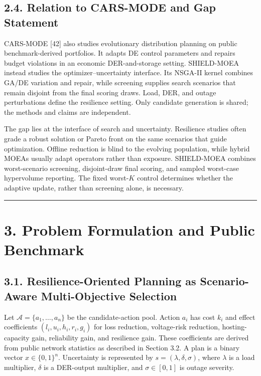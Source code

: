 \documentclass[
  10pt,
  a4paper,
]{article}
\begin{document}
\subsection{2.4. Relation to CARS-MODE and Gap
Statement}\label{relation-to-cars-mode-and-gap-statement}

CARS-MODE {[}42{]} also studies evolutionary distribution planning on
public benchmark-derived portfolios. It adapts DE control parameters and
repairs budget violations in an economic DER-and-storage setting.
SHIELD-MOEA instead studies the optimizer--uncertainty interface. Its
NSGA-II kernel combines GA/DE variation and repair, while screening
supplies search scenarios that remain disjoint from the final scoring
draws. Load, DER, and outage perturbations define the resilience
setting. Only candidate generation is shared; the methods and claims are
independent.

The gap lies at the interface of search and uncertainty. Resilience
studies often grade a robust solution or Pareto front on the same
scenarios that guide optimization. Offline reduction is blind to the
evolving population, while hybrid MOEAs usually adapt operators rather
than exposure. SHIELD-MOEA combines worst-scenario screening,
disjoint-draw final scoring, and sampled worst-case hypervolume
reporting. The fixed worst-\(K\) control determines whether the adaptive
update, rather than screening alone, is necessary.

\begin{center}\rule{0.5\linewidth}{0.5pt}\end{center}

\section{3. Problem Formulation and Public
Benchmark}\label{problem-formulation-and-public-benchmark}

\subsection{3.1. Resilience-Oriented Planning as Scenario-Aware
Multi-Objective
Selection}\label{resilience-oriented-planning-as-scenario-aware-multi-objective-selection}

Let \(\mathcal{A}=\{a_1,\ldots,a_n\}\) be the candidate-action pool.
Action \(a_i\) has cost \(k_i\) and effect coefficients
\((l_i,u_i,h_i,r_i,g_i)\) for loss reduction, voltage-risk reduction,
hosting-capacity gain, reliability gain, and resilience gain. These
coefficients are derived from public network statistics as described in
Section 3.2. A plan is a binary vector \(x\in\{0,1\}^n\). Uncertainty is
represented by \(s=(\lambda,\delta,\sigma)\), where \(\lambda\) is a
load multiplier, \(\delta\) is a DER-output multiplier, and
\(\sigma\in[0,1]\) is outage severity.
\end{document}

